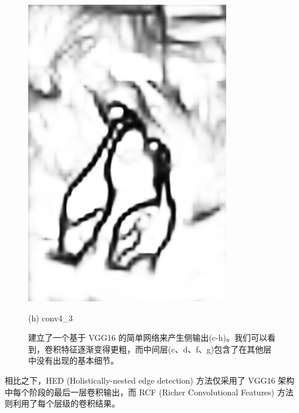\documentclass[CJK,aspectratio=169]{beamer}  %
\begin{document}
\begin{frame}
\begin{figure}
\begin{minipage}{0.11\columnwidth}
				\includegraphics[width=\linewidth]{picture/LLIE/RCF/conv4_3}
				\caption*{\tiny (h) conv4\_3}
				\label{fig: conv4_3}	
			\end{minipage}
			\caption{
				\tiny 建立了一个基于 VGG16\cite{simonyan2014very} 的简单网络来产生侧输出(c-h)。我们可以看到，卷积特征逐渐变得更粗，而中间层(c、d、f、g)包含了在其他层中没有出现的基本细节。
			}
		\end{figure}
		
		{ \yahei 相比之下，HED (Holistically-nested edge detection) \textcolor{blue}{\cite{xie2015holistically}}方法仅采用了 VGG16 架构中每个阶段的最后一层卷积输出，而 RCF (Richer Convolutional Features) 方法则利用了每个层级的卷积结果。}
		
	\end{frame}
	
\end{document}
